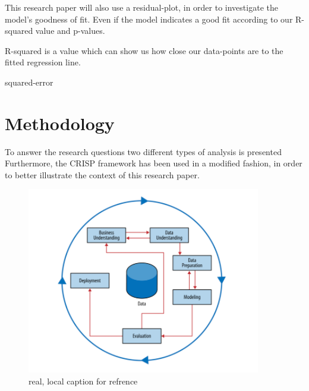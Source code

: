 \documentclass[11pt]{article}
\begin{document}
This research paper will also use a residual-plot, in order to investigate the model's goodness of fit. Even if the model indicates a good fit according to our R-squared value and p-values. 

R-squared is a value which can show us how close our data-points are to the fitted regression line.



squared-error 





\section{Methodology}
To answer the research questions two different types of analysis is presented\\


Furthermore,  the CRISP framework has been used in a modified fashion, in order to better illustrate the context of this research paper.\\

\begin{figure}[H] %
	\centering %
\includegraphics [scale= .95]  {CRISP.PNG}    %
	\caption[Optional caption] {real, local caption for refrence}
	\label{fig:wordcloudBliz}

\end{figure}
\end{document}
